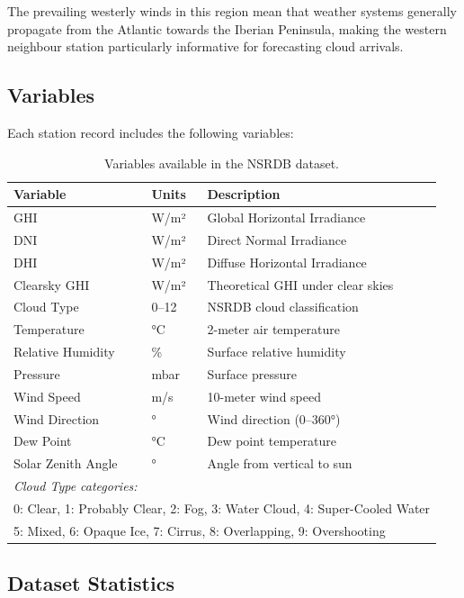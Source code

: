 \documentclass[11pt,a4paper]{article}
\begin{document}
The prevailing westerly winds in this region mean that weather systems generally propagate from the Atlantic towards the Iberian Peninsula, making the western neighbour station particularly informative for forecasting cloud arrivals.

\subsection{Variables}

Each station record includes the following variables:

\begin{table}[H]
\centering
\caption{Variables available in the NSRDB dataset.}
\label{tab:variables}
\begin{tabular}{lll}
\toprule
\textbf{Variable} & \textbf{Units} & \textbf{Description} \\
\midrule
GHI & W/m² & Global Horizontal Irradiance \\
DNI & W/m² & Direct Normal Irradiance \\
DHI & W/m² & Diffuse Horizontal Irradiance \\
Clearsky GHI & W/m² & Theoretical GHI under clear skies \\
Cloud Type & 0--12 & NSRDB cloud classification \\
Temperature & °C & 2-meter air temperature \\
Relative Humidity & \% & Surface relative humidity \\
Pressure & mbar & Surface pressure \\
Wind Speed & m/s & 10-meter wind speed \\
Wind Direction & ° & Wind direction (0--360°) \\
Dew Point & °C & Dew point temperature \\
Solar Zenith Angle & ° & Angle from vertical to sun \\
\midrule
\multicolumn{3}{l}{\textit{Cloud Type categories:}} \\
\multicolumn{3}{l}{0: Clear, 1: Probably Clear, 2: Fog, 3: Water Cloud, 4: Super-Cooled Water} \\
\multicolumn{3}{l}{5: Mixed, 6: Opaque Ice, 7: Cirrus, 8: Overlapping, 9: Overshooting} \\
\bottomrule
\end{tabular}
\end{table}

\subsection{Dataset Statistics}
\end{document}
